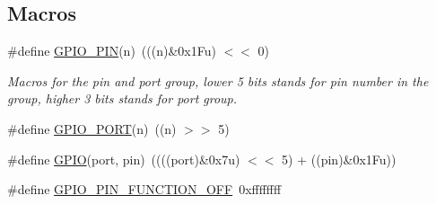 \subsection*{Macros}
\begin{DoxyCompactItemize}
\item 
\#define \hyperlink{group___h_p_l_ga50e2e0aca2b651e066ebc5aeb5fdad25}{G\+P\+I\+O\+\_\+\+P\+IN}(n)~(((n)\&0x1\+Fu) $<$$<$ 0)
\begin{DoxyCompactList}\small\item\em Macros for the pin and port group, lower 5 bits stands for pin number in the group, higher 3 bits stands for port group. \end{DoxyCompactList}\item 
\#define \hyperlink{group___h_p_l_ga9797315af6a0aa3291bb73648a3b1379}{G\+P\+I\+O\+\_\+\+P\+O\+RT}(n)~((n) $>$$>$ 5)
\item 
\#define \hyperlink{group___h_p_l_gaf065b9160b968f60a562bdc5c4454a5a}{G\+P\+IO}(port,  pin)~((((port)\&0x7u) $<$$<$ 5) + ((pin)\&0x1\+Fu))
\item 
\#define \hyperlink{group___h_p_l_ga4ac520942c3dfa92e76b896518718576}{G\+P\+I\+O\+\_\+\+P\+I\+N\+\_\+\+F\+U\+N\+C\+T\+I\+O\+N\+\_\+\+O\+FF}~0xffffffff
\end{DoxyCompactItemize}
